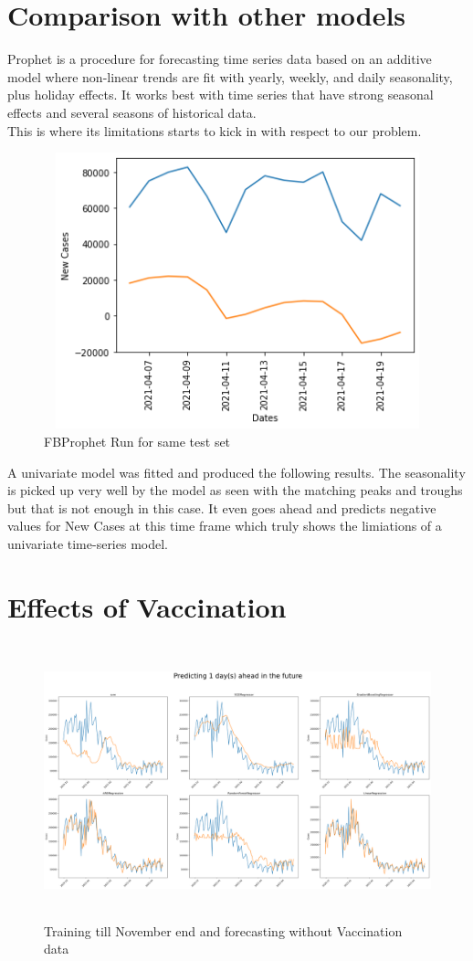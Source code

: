 \documentclass[12pt,a4paper]{article}
\begin{document}
\section*{Comparison with other models}
Prophet is a procedure for forecasting time series data based on an additive model where non-linear trends are fit with yearly, weekly, and daily seasonality, plus holiday effects. It works best with time series that have strong seasonal effects and several seasons of historical data.
\\
This is where its limitations starts to kick in with respect to our problem.
\begin{figure}[H]
    \centering
    \includegraphics[width=1\textwidth,height=80mm]{images/usa/fbprophetrun.png}
    \caption{FBProphet Run for same test set}
\end{figure}
A univariate model was fitted and produced the following results. The seasonality is picked up very 
well by the model as seen with the matching peaks and troughs but that is not enough in this case. It even goes ahead
and predicts negative values for New Cases at this time frame which truly shows the limiations of a 
univariate time-series model. 
\section*{Effects of Vaccination}
\begin{figure}[H]
    \centering
    \includegraphics[width=1\textwidth,height=80mm]{images/usa/vaccination_analysis.png}
    \caption{Training till November end and forecasting without Vaccination data}
\end{figure}
\end{document}
